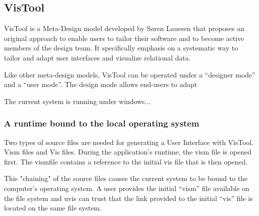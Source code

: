 \subsection{VisTool}

VisTool is a Meta-Design model developed by Søren Lauesen that proposes an original approach to enable users to tailor their software and to become active members of the design team. It specifically emphasis on a systematic way to tailor and adapt user interfaces and visualize relational data.



Like other meta-design models, VisTool can be operated under a ``designer mode'' and a ``user mode''. The design mode allows end-users to adapt 

The current system is running under windows...

\subsubsection{A runtime bound to the local operating system}

Two types of source files are needed for generating a User Interface with VisTool. Vism files and Vis files. During the application's runtime, the vism file is opened first. The vismfile contains a reference to the initial vis file that is then opened.

This "chaining" of the source files causes the current system to be bound to the computer's operating system. A user provides the initial ``vism'' file available on the file system and uvis can trust that the link provided to the initial ``vis'' file is located on the same file system.